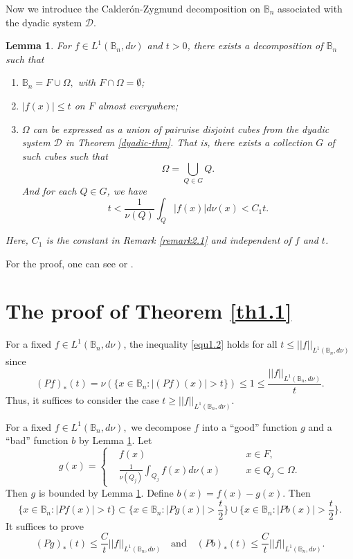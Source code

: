 \documentclass[12pt]{amsart}
\newtheorem{lemma}[theorem]{Lemma}
\theoremstyle{definition}
\theoremstyle{remark}
\newcommand{\B}{\mathbb{B}}
\begin{document}
Now we introduce the Calder\'on-Zygmund decomposition on $\B_n$ associated with the dyadic system $\mathscr{D}$.
\begin{lemma}\label{C-Z}
	For $f\in L^1(\B_n,d\nu)$ and $t>0$, there exists a decomposition of $\B_n$ such that
	\begin{enumerate}[{(i)}]
		\item $\B_n=F\cup\Omega,$ with $ F\cap\Omega=\emptyset$;
		\item $|f(x)|\leqslant t$ on $F$ almost everywhere;
		\item $\Omega$ can be expressed as a union of pairwise disjoint cubes from the dyadic system $\mathscr{D}$ in Theorem \ref{dyadic-thm}. 
		That is, there exists a collection $G$ of such cubes such that
		\[\Omega=\bigcup\limits_{Q\in G} Q.\]
		And for each $Q\in G$, we have
		\[t<\frac{1}{\nu (Q)}\int_{Q}|f(x)|d\nu (x)<C_1t.\]
	\end{enumerate}
	Here, $C_1$ is the constant in Remark \ref{remark2.1} and independent of $f$ and $t$.
\end{lemma}
For the proof, one can see \cite[\S 1, 3.2]{Stein} or \cite[\S 5.3]{GTM}.

\section{The proof of Theorem \ref{th1.1}}
For a fixed $f\in L^1(\B_n,d\nu)$, the inequality \eqref{equ1.2} holds for all $t\leqslant||f||_{L^1(\B_n,d\nu)}$ since
\[(P  f)_*(t)=\nu (\{x\in\B_n:|(P  f)(x)|>t\})\leqslant 1 \leqslant\frac{||f||_{L^1(\B_n,d\nu)}}{t}.\]
Thus, it suffices to consider the case $t\geqslant||f||_{L^1(\B_n,d\nu)}.$ 

For a fixed $f\in L^1(\B_n,d\nu),$ we decompose $f$ into a ``good'' function $g$ and a ``bad'' function $b$ by Lemma \ref{C-Z}. Let 
\begin{equation*}
    g(x) = \left\{
    \begin{aligned}
	    &f(x)&& x\in F ,\\
	    &\frac{1}{\nu (Q_j)}\int_{Q_j}f(x)d\nu (x)\quad&&x\in Q_j\subset \Omega.
    \end{aligned} \right.
\end{equation*}
Then $g$ is bounded by Lemma \ref{C-Z}. Define $b(x)=f(x)-g(x)$. Then 
\[\{x\in\B_n:|P  f(x)|>t\}\subset\{x\in\B_n:|P  g(x)|>\frac{t}{2}\}\cup\{x\in\B_n:|P  b(x)|>\frac{t}{2}\}.\]
It suffices to prove 
\[(P  g)_*(t)\leqslant\frac{C}{t}||f||_{L^1(\B_n,d\nu)}\quad\mbox{and}\quad (P  b)_*(t)\leqslant\frac{C}{t}||f||_{L^1(\B_n,d\nu)}.\]
\end{document}
